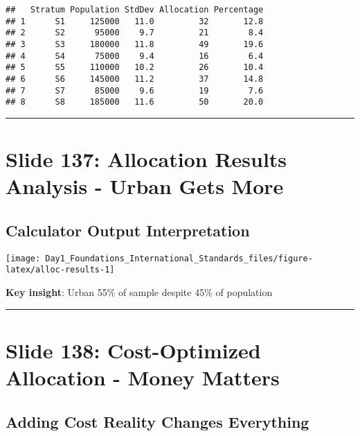 \documentclass[
]{article}
\begin{document}
\begin{verbatim}
##   Stratum Population StdDev Allocation Percentage
## 1      S1     125000   11.0         32       12.8
## 2      S2      95000    9.7         21        8.4
## 3      S3     180000   11.8         49       19.6
## 4      S4      75000    9.4         16        6.4
## 5      S5     110000   10.2         26       10.4
## 6      S6     145000   11.2         37       14.8
## 7      S7      85000    9.6         19        7.6
## 8      S8     185000   11.6         50       20.0
\end{verbatim}

\begin{center}\rule{0.5\linewidth}{0.5pt}\end{center}

\section{Slide 137: Allocation Results Analysis - Urban Gets
More}\label{slide-137-allocation-results-analysis---urban-gets-more}

\subsection{Calculator Output
Interpretation}\label{calculator-output-interpretation}

\texttt{[image: Day1\_Foundations\_International\_Standards\_files/figure-latex/alloc-results-1]}

\textbf{Key insight}: Urban 55\% of sample despite 45\% of population

\begin{center}\rule{0.5\linewidth}{0.5pt}\end{center}

\section{Slide 138: Cost-Optimized Allocation - Money
Matters}\label{slide-138-cost-optimized-allocation---money-matters}

\subsection{Adding Cost Reality Changes
Everything}\label{adding-cost-reality-changes-everything}
\end{document}

